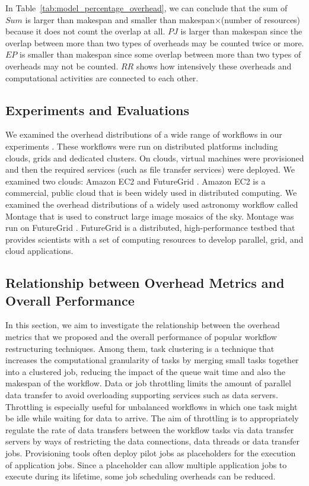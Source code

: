 In Table~\ref{tab:model_percentage_overhead}, we can conclude that the sum of $Sum$ is larger than makespan and smaller than makespan$\times$(number of resources) because it does not count the overlap at all. $PJ$ is larger than makespan since the overlap between more than two types of overheads may be counted twice or more. $EP$ is smaller than makespan since some overlap between more than two types of overheads may not be counted.  $RR$ shows how intensively these overheads and computational activities are connected to each other. 

\subsection{Experiments and Evaluations}

We examined the overhead distributions of a wide range of workflows in our experiments . These workflows were run on distributed platforms including clouds, grids and dedicated clusters. 
On clouds, virtual machines were provisioned and then the required services (such as file transfer services) were deployed. 
We examined two clouds: Amazon EC2 \cite{AmazonEC2}  and FutureGrid \cite{FutureGrid}. Amazon EC2 is a commercial, public cloud that is been widely used in distributed computing. 
We examined the overhead distributions of a widely used astronomy workflow called Montage \cite{Berriman2004} that is used to construct large image mosaics of the sky. Montage was run on FutureGrid \cite{FutureGrid}. FutureGrid is a distributed, high-performance testbed that provides scientists with a set of computing resources to develop parallel, grid, and cloud applications. 
\subsection{Relationship between Overhead Metrics and Overall Performance}

In this section, we aim to investigate the relationship between the overhead metrics that we proposed and the overall performance of popular workflow restructuring techniques. Among them, task clustering \cite{Singh2008} is a technique that increases the computational granularity of tasks by merging small tasks together into a clustered job, reducing the impact of the queue wait time and also the makespan of the workflow. Data or job throttling \cite{Humphrey2008} limits the amount of parallel data transfer to avoid overloading supporting services such as data servers. Throttling is especially useful for unbalanced workflows in which one task might be idle while waiting for data to arrive. The aim of throttling is to appropriately regulate the rate of data transfers between the workflow tasks via data transfer servers by ways of restricting the data connections, data threads or data transfer jobs. Provisioning tools often deploy pilot jobs as placeholders for the execution of application jobs. Since a placeholder can allow multiple application jobs to execute during its lifetime, some job scheduling overheads can be reduced. 


